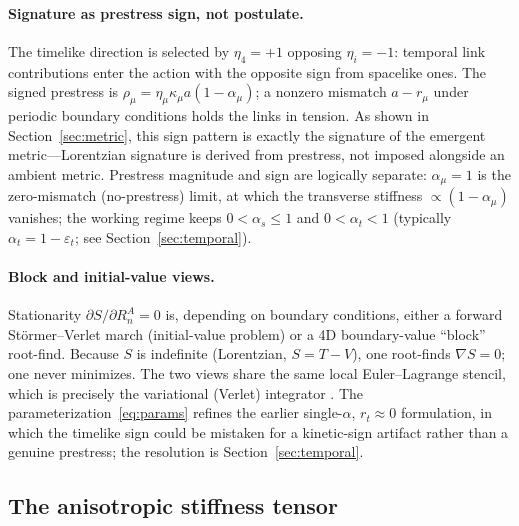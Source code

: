 \paragraph{Signature as prestress sign, not postulate.} The timelike direction is selected
by $\eta_4=+1$ opposing $\eta_i=-1$: temporal link contributions enter the action with the
opposite sign from spacelike ones. The signed prestress is
$\rho_\mu = \eta_\mu\kappa_\mu a(1-\alpha_\mu)$; a nonzero mismatch $a-r_\mu$ under
periodic boundary conditions holds the links in tension. As shown in
Section~\ref{sec:metric}, this sign pattern is exactly the signature of the emergent
metric---Lorentzian signature is derived from prestress, not imposed alongside an ambient
metric. Prestress magnitude and sign are logically separate: $\alpha_\mu=1$ is the
zero-mismatch (no-prestress) limit, at which the transverse stiffness $\propto(1-\alpha_\mu)$
vanishes; the working regime keeps $0<\alpha_s\le 1$ and $0<\alpha_t<1$ (typically
$\alpha_t=1-\varepsilon_t$; see Section~\ref{sec:temporal}).

\paragraph{Block and initial-value views.} Stationarity $\partial S/\partial R_n^A=0$ is,
depending on boundary conditions, either a forward Störmer--Verlet march (initial-value
problem) or a 4D boundary-value ``block'' root-find. Because $S$ is indefinite
(Lorentzian, $S=T-V$), one root-finds $\nabla S=0$; one never minimizes. The two views
share the same local Euler--Lagrange stencil, which is precisely the variational (Verlet)
integrator \citep{MarsdenWest2001}. The parameterization~\eqref{eq:params} refines the
earlier single-$\alpha$, $r_t\approx 0$ formulation, in which the timelike sign could be
mistaken for a kinetic-sign artifact rather than a genuine prestress; the resolution is
Section~\ref{sec:temporal}.

\subsection{The anisotropic stiffness tensor}
\label{subsec:stiffness}

